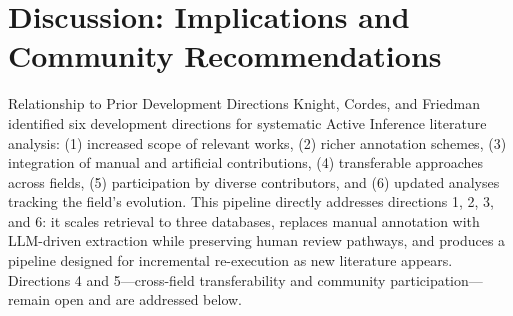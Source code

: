 \documentclass[
  ignorenonframetext,
]{beamer}
\author{\texorpdfstring{}{}}
\date{}
\begin{document}
\section{\texorpdfstring{Discussion: Implications and Community
Recommendations
\label{sec:discussion}}{Discussion: Implications and Community Recommendations }}\label{discussion-implications-and-community-recommendations}

\begin{frame}{Relationship to Prior Development Directions}
\protect{}\label{relationship-to-prior-development-directions}
Knight, Cordes, and Friedman \citep{knight2022fep} identified six
development directions for systematic Active Inference literature
analysis: (1) increased scope of relevant works, (2) richer annotation
schemes, (3) integration of manual and artificial contributions, (4)
transferable approaches across fields, (5) participation by diverse
contributors, and (6) updated analyses tracking the field's evolution.
This pipeline directly addresses directions 1, 2, 3, and 6: it scales
retrieval to three databases, replaces manual annotation with LLM-driven
extraction while preserving human review pathways, and produces a
pipeline designed for incremental re-execution as new literature
appears. Directions 4 and 5---cross-field transferability and community
participation---remain open and are addressed below.
\end{frame}
\end{document}
